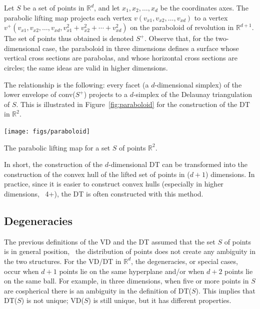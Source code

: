 Let $S$ be a set of points in $\mathbb{R}^{d}$, and let $x_{1}, x_{2}, \ldots , x_{d}$ be the coordinates axes. 
The parabolic lifting map projects each vertex $v(v_{x1}, v_{x2}, \ldots , v_{xd})$ to a vertex $v^{+}(v_{x1}, v_{x2}, \ldots , v_{xd}, v_{x1}^{2}+v_{x2}^{2}+\cdots+v_{xd}^{2})$ on the paraboloid of revolution in $\mathbb{R}^{d+1}$. 
The set of points thus obtained is denoted $S^{+}$. 
Observe that, for the two-dimensional case, the paraboloid in three dimensions defines a surface whose vertical cross sections are parabolas, and whose horizontal cross sections are circles; the same ideas are valid in higher dimensions. 

%

The relationship is the following: every facet (a $d$-dimensional simplex) of the lower envelope of conv($S^{+}$) projects to a $d$-simplex of the Delaunay triangulation of $S$. 
This is illustrated in Figure~\ref{fig:paraboloid} for the construction of the DT in $\mathbb{R}^{2}$. 
\begin{marginfigure}
  \centering
  \texttt{[image: figs/paraboloid]}
  \caption{The parabolic lifting map for a set $S$ of points $\mathbb{R}^2$.}%
\label{fig:paraboloid}
\end{marginfigure}

%

In short, the construction of the $d$-dimensional DT can be transformed into the construction of the convex hull of the lifted set of points in ($d+1$) dimensions.
In practice, since it is easier to construct convex hulls (especially in higher dimensions, \ie\ 4+), the DT is often constructed with this method.


\subsection{Degeneracies}%
\label{sec:degeneracies}

The previous definitions of the VD and the DT assumed that the set $S$ of points is in general position, \ie\ the distribution of points does not create any ambiguity in the two structures. 
For the VD/DT in $\mathbb{R}^{d}$, the degeneracies, or special cases, occur when $d+1$ points lie on the same hyperplane and/or when $d+2$ points lie on the same ball. 
For example, in three dimensions, when five or more points in $S$ are cospherical there is an ambiguity in the definition of DT($S$). 
This implies that DT($S$) is not unique; VD($S$) is still unique, but it has different properties.


